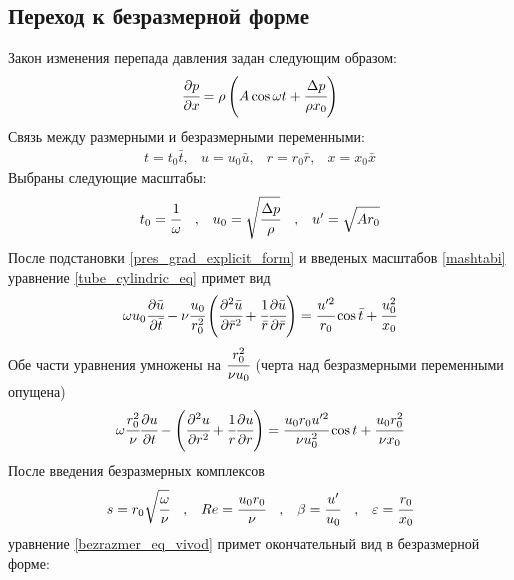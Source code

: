 \documentclass[12pt]{article}
\begin{document}
\subsection{Переход к безразмерной форме}
Закон изменения перепада давления задан следующим образом:
\begin{equation}
\label{pres_grad_explicit_form}
\cfrac{\partial p}{\partial x}=\rho \left(A\cos\omega t+\cfrac{\Delta p}{\rho x_0}\right)
\end{equation}
Связь между размерными и безразмерными переменными:
\begin{equation}
\begin{array}{lllllllll}
t=t_0\bar{t},&
u=u_0 \bar{u},&
r=r_0 \bar{r},&
x=x_0 \bar{x}
\end{array}
\end{equation}
Выбраны следующие масштабы:
\begin{equation}
\label{mashtabi} 
\begin{array}{lllll}
t_0=\cfrac{1}{\omega}&,&
u_0=\sqrt{\cfrac{\Delta p}{\rho}}&,&
u'=\sqrt{\strut{A r_0}}
\end{array}
\end{equation}
После подстановки \eqref{pres_grad_explicit_form} и введеных масштабов \eqref{mashtabi} уравнение \eqref{tube_cylindric_eq} примет вид
\begin{equation}
\omega u_0\cfrac{\partial \bar{u}}{\partial \bar{t}}-\nu \cfrac{u_0}{r_0^2}\left(\cfrac{\partial^2\bar{u}}{\partial \bar{r}^2}+\cfrac{1}{\bar{r}}\cfrac{\partial \bar{u}}{\partial \bar{r}}\right)=\cfrac{u'^2}{r_0}\cos\bar{t}+\cfrac{u_0^2}{x_0}
\end{equation}
Обе части уравнения умножены на $\cfrac{r_0^2}{\nu u_0}$ (черта над безразмерными переменными опущена)
\begin{equation}
\label{bezrazmer_eq_vivod}
\omega \cfrac{r_0^2}{\nu}\cfrac{\partial u}{\partial t}-\left(\cfrac{\partial^2u}{\partial r^2}+\cfrac{1}{r}\cfrac{\partial u}{\partial r}\right)=\cfrac{u_0 r_0 u'^2}{\nu u_0^2}\cos t+\cfrac{u_0 r_0^2}{\nu x_0}
\end{equation}
После введения безразмерных комплексов
\begin{equation*}
\begin{array}{lllllll}
s=r_0\sqrt{\cfrac{\omega}{\nu}}&,&
Re=\cfrac{u_0 r_0}{\nu}&,&
\beta=\cfrac{u'}{u_0}&,&
\varepsilon=\cfrac{r_0}{x_0}
\end{array}
\end{equation*}
уравнение \eqref{bezrazmer_eq_vivod} примет окончательный вид в безразмерной форме:
\end{document}
